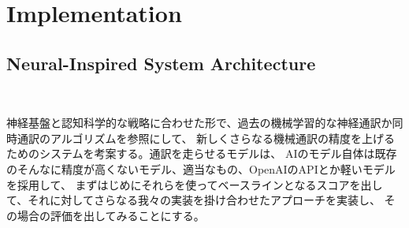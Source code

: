 \section{Implementation}

\subsection{Neural-Inspired System Architecture}
  

神経基盤と認知科学的な戦略に合わせた形で、過去の機械学習的な神経通訳か同時通訳のアルゴリズムを参照にして、
新しくさらなる機械通訳の精度を上げるためのシステムを考案する。通訳を走らせるモデルは、
AIのモデル自体は既存のそんなに精度が高くないモデル、適当なもの、OpenAIのAPIとか軽いモデルを採用して、
まずはじめにそれらを使ってベースラインとなるスコアを出して、それに対してさらなる我々の実装を掛け合わせたアプローチを実装し、
その場合の評価を出してみることにする。